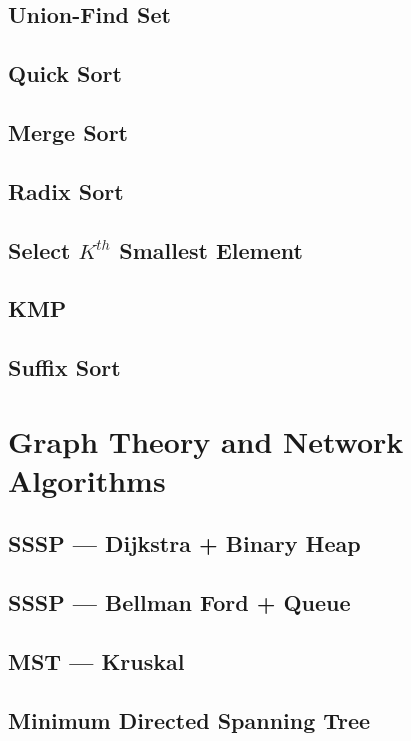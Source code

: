 \documentclass{report}
\begin{document}
\begin{CJK*}{GBK}{kai}
\section{Union-Find Set}
 \label{unionfind_set}
\section{Quick Sort}

\clearpage
\section{Merge Sort}

\section{Radix Sort}

\section{Select $K^{th}$ Smallest Element}

\section{KMP}

\section{Suffix Sort}


\chapter{Graph Theory and Network Algorithms}
\section{SSSP --- Dijkstra + Binary Heap}

\section{SSSP --- Bellman Ford + Queue}

\section{MST  --- Kruskal}

\section{Minimum Directed Spanning Tree}


\end{CJK*}
\end{document}
